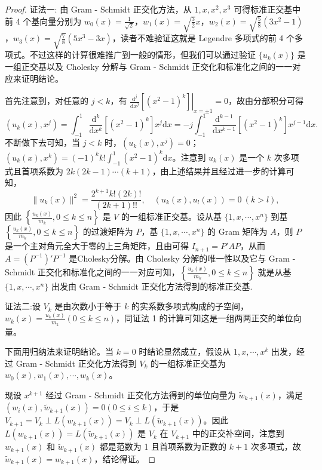 \documentclass[../../main.tex]{subfiles}%
\begin{document}
\begin{proof}

{\color{blue}证法一:}
由 Gram - Schmidt 正交化方法，从 $1,x,x^2,x^3$ 可得标准正交基中前 4 个基向量分别为 $w_0(x)=\frac{1}{\sqrt{2}}$，$w_1(x)=\sqrt{\frac{3}{2}}x$，$w_2(x)=\sqrt{\frac{5}{8}}(3x^2 - 1)$，$w_3(x)=\sqrt{\frac{7}{8}}(5x^3 - 3x)$，读者不难验证这就是 Legendre 多项式的前 4 个多项式。不过这样的计算很难推广到一般的情形，但我们可以通过验证 $\{u_k(x)\}$ 是一组正交基以及 Cholesky 分解与 Gram - Schmidt 正交化和标准化之间的一一对应来证明结论。

首先注意到，对任意的 $j < k$，有 $\left.\frac{\mathrm{d}^j}{\mathrm{d}x^j}[(x^2 - 1)^k]\right|_{x = \pm1}=0$，故由分部积分可得
\[
(u_k(x),x^j)=\int_{-1}^{1}\frac{\mathrm{d}^k}{\mathrm{d}x^k}[(x^2 - 1)^k]x^j\mathrm{d}x=-j\int_{-1}^{1}\frac{\mathrm{d}^{k - 1}}{\mathrm{d}x^{k - 1}}[(x^2 - 1)^k]x^{j - 1}\mathrm{d}x.
\]
不断做下去可知，当 $j < k$ 时，$(u_k(x),x^j)=0$；$(u_k(x),x^k)=(-1)^kk!\int_{-1}^{1}(x^2 - 1)^k\mathrm{d}x$。注意到 $u_k(x)$ 是一个 $k$ 次多项式且首项系数为 $2k(2k - 1)\cdots(k + 1)$，由上述结果并且经过进一步的计算可知，
\[
\|u_k(x)\|^2=\frac{2^{k + 1}k!(2k)!}{(2k + 1)!!},\quad (u_k(x),u_l(x))=0\ (k > l),
\]
因此 $\left\{\frac{u_k(x)}{m_k},0\leqslant  k\leqslant  n\right\}$ 是 $V$ 的一组标准正交基。设从基 $\{1,x,\cdots,x^n\}$ 到基 $\left\{\frac{u_k(x)}{m_k},0\leqslant  k\leqslant  n\right\}$ 的过渡矩阵为 $P$，基 $\{1,x,\cdots,x^n\}$ 的 Gram 矩阵为 $A$，则 $P$ 是一个主对角元全大于零的上三角矩阵，且由可得 $I_{n + 1}=P'AP$，从而 $A=(P^{-1})'P^{-1}$ 是Cholesky分解。由 Cholesky 分解的唯一性以及它与 Gram - Schmidt 正交化和标准化之间的一一对应可知，$\left\{\frac{u_k(x)}{m_k},0\leqslant  k\leqslant  n\right\}$ 就是从基 $\{1,x,\cdots,x^n\}$ 出发由 Gram - Schmidt 正交化方法得到的标准正交基.

{\color{blue}证法二:}设 $V_k$ 是由次数小于等于 $k$ 的实系数多项式构成的子空间，$w_k(x) = \frac{u_k(x)}{m_k} (0 \leqslant  k \leqslant  n)$，同证法 1 的计算可知这是一组两两正交的单位向量。

下面用归纳法来证明结论。当 $k = 0$ 时结论显然成立，假设从 $1, x, \cdots, x^k$ 出发，经过 Gram - Schmidt 正交化方法得到 $V_k$ 的一组标准正交基为 $w_0(x), w_1(x), \cdots, w_k(x)$。

现设 $x^{k + 1}$ 经过 Gram - Schmidt 正交化方法得到的单位向量为 $\widetilde{w}_{k + 1}(x)$，满足 $(w_i(x), \widetilde{w}_{k + 1}(x)) = 0 (0 \leqslant  i \leqslant  k)$，于是 $V_{k + 1} = V_k \perp L(w_{k + 1}(x)) = V_k \perp L(\widetilde{w}_{k + 1}(x))$。因此 $L(w_{k + 1}(x)) = L(\widetilde{w}_{k + 1}(x))$ 是 $V_k$ 在 $V_{k + 1}$ 中的正交补空间，注意到 $w_{k + 1}(x)$ 和 $\widetilde{w}_{k + 1}(x)$ 都是范数为 1 且首项系数为正数的 $k + 1$ 次多项式，故 $\widetilde{w}_{k + 1}(x) = w_{k + 1}(x)$，结论得证。
\end{proof}
\end{document}
